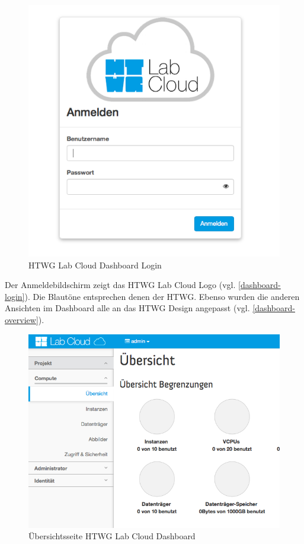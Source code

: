 \begin{figure}[htbp]
\centering
\includegraphics[scale=0.4]{img/dashboard-login.png}
\caption{HTWG Lab Cloud Dashboard Login}
\label{dashboard-login}
\end{figure}

Der Anmeldebildschirm zeigt das HTWG Lab Cloud Logo (vgl. \autoref{dashboard-login}).
Die Blautöne entsprechen denen der HTWG.
Ebenso wurden die anderen Ansichten im Dashboard alle an das HTWG Design angepasst (vgl. \autoref{dashboard-overview}).

\begin{figure}[htbp]
\centering
\includegraphics[scale=0.6]{img/dashboard-overview.png}
\caption{Übersichtsseite HTWG Lab Cloud Dashboard}
\label{dashboard-overview}
\end{figure}

